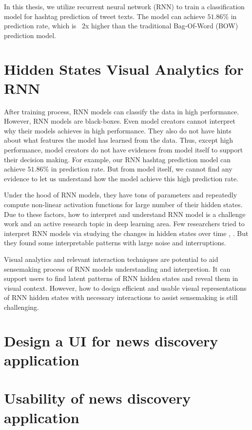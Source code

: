 In this thesis, we utilize recurrent neural network (RNN) to train a classification model for hashtag prediction of tweet texts. The model can achieve $51.86\%$ in prediction rate, which is ~2x higher than the traditional Bag-Of-Word (BOW) prediction model.

\section{Hidden States Visual Analytics for RNN}

After training process, RNN models can classify the data in high performance. However, RNN models are black-boxes. Even model creators cannot interpret why their models achieves in high performance. They also do not have hints about what features the model has learned from the data. Thus, except high performance, model creators do not have evidences from model itself to support their decision making.  For example, our RNN hashtag prediction model can achieve $51.86\%$ in prediction rate. But from model itself, we cannot find any evidence to let us understand how the model achieve this high prediction rate. 

Under the hood of RNN models, they have tons of parameters and repeatedly compute non-linear activation functions for large number of their hidden states. Due to these factors, how to interpret and understand RNN model is a challenge work and an active research topic in deep learning area. Few researchers tried to interpret RNN models via studying the changes in hidden states over time \cite{Strobelt2016} \cite{Li2016}, . But they found some interpretable patterns with large noise and interruptions. 

Visual analytics and relevant interaction techniques are potential to aid sensemaking process \cite{Pirolli2005} of RNN models understanding and interpretion. It can support users to find latent patterns of RNN hidden states and reveal them in visual context. However, how to design efficient and usable visual representations of RNN hidden states with necessary interactions to assist sensemaking is still challenging.


\section{Design a UI for news discovery application}

\section{Usability of news discovery application}

